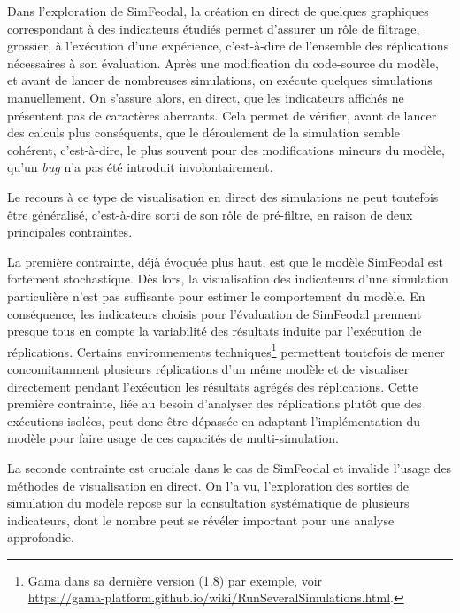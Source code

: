 	Dans l'exploration de SimFeodal, la création en direct de quelques graphiques correspondant à des indicateurs étudiés permet d'assurer un rôle de filtrage, grossier, à l'exécution d'une expérience, c'est-à-dire de l'ensemble des réplications nécessaires à son évaluation.
	Après une modification du code-source du modèle, et avant de lancer de nombreuses simulations, on exécute quelques simulations \og manuellement\fg{}.
	On s'assure alors, en direct, que les indicateurs affichés ne présentent pas de caractères aberrants.
	Cela permet de vérifier, avant de lancer des calculs plus conséquents, que le déroulement de la simulation semble cohérent, c'est-à-dire, le plus souvent pour des modifications mineurs du modèle,  qu'un \textit{bug} n'a pas été introduit involontairement.
	
	Le recours à ce type de visualisation en direct des simulations ne peut toutefois être généralisé, c'est-à-dire sorti de son rôle de pré-filtre, en raison de deux principales contraintes.

	La première contrainte, déjà évoquée plus haut, est que le modèle SimFeodal est fortement stochastique.
	Dès lors, la visualisation des indicateurs d'une simulation particulière n'est pas suffisante pour estimer le comportement du modèle.
	En conséquence, les indicateurs choisis pour l'évaluation de SimFeodal prennent presque tous en compte la variabilité des résultats induite par l'exécution de réplications.
	Certains environnements techniques\footnote{
	Gama dans sa dernière version (1.8) par exemple, voir\\ \href{https://gama-platform.github.io/wiki/RunSeveralSimulations.html}{https://gama-platform.github.io/wiki/RunSeveralSimulations.html}.
	} permettent toutefois de mener concomitamment plusieurs réplications d'un même modèle et de visualiser directement pendant l'exécution les résultats agrégés des réplications.
	Cette première contrainte, liée au besoin d'analyser des réplications plutôt que des exécutions isolées, peut donc être dépassée en adaptant l'implémentation du modèle pour faire usage de ces capacités de multi-simulation.

	La seconde contrainte est cruciale dans le cas de SimFeodal et invalide l'usage des méthodes de visualisation en direct.
	On l'a vu, l'exploration des sorties de simulation du modèle repose sur la consultation systématique de plusieurs indicateurs, dont le nombre peut se révéler important pour une analyse approfondie.
	
